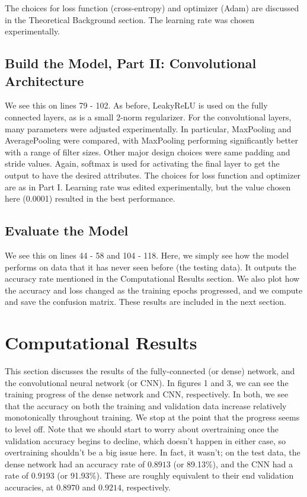 \documentclass[a4paper,10 pt]{article}
\begin{document}
The choices for loss function (cross-entropy) and optimizer (Adam) are discussed in the Theoretical Background section. The learning rate was chosen experimentally.

\subsection{Build the Model, Part II: Convolutional Architecture}
We see this on lines 79 - 102. As before, LeakyReLU is used on the fully connected layers, as is a small 2-norm regularizer. For the convolutional layers, many parameters were adjusted experimentally. In particular, MaxPooling and AveragePooling were compared, with MaxPooling performing significantly better with a range of filter sizes. Other major design choices were same padding and stride values. Again, softmax is used for activating the final layer to get the output to have the desired attributes. The choices for loss function and optimizer are as in Part I. Learning rate was edited experimentally, but the value chosen here (0.0001) resulted in the best performance.

\subsection{Evaluate the Model}
We see this on lines 44 - 58 and 104 - 118. Here, we simply see how the model performs on data that it has never seen before (the testing data). It outputs the accuracy rate mentioned in the Computational Results section. We also plot how the accuracy and loss changed as the training epochs progressed, and we compute and save the confusion matrix. These results are included in the next section.

\section{Computational Results}
This section discusses the results of the fully-connected (or dense) network, and the convolutional neural network (or CNN). In figures 1 and 3, we can see the training progress of the dense network and CNN, respectively. In both, we see that the accuracy on both the training and validation data increase relatively monotonically throughout training. We stop at the point that the progress seems to level off. Note that we should start to worry about overtraining once the validation accuracy begins to decline, which doesn't happen in either case, so overtraining shouldn't be a big issue here. In fact, it wasn't; on the test data, the dense network had an accuracy rate of $0.8913$ (or 89.13\%), and the CNN had a rate of $0.9193$ (or 91.93\%). These are roughly equivalent to their end validation accuracies, at $0.8970$ and $0.9214$, respectively.
\end{document}
